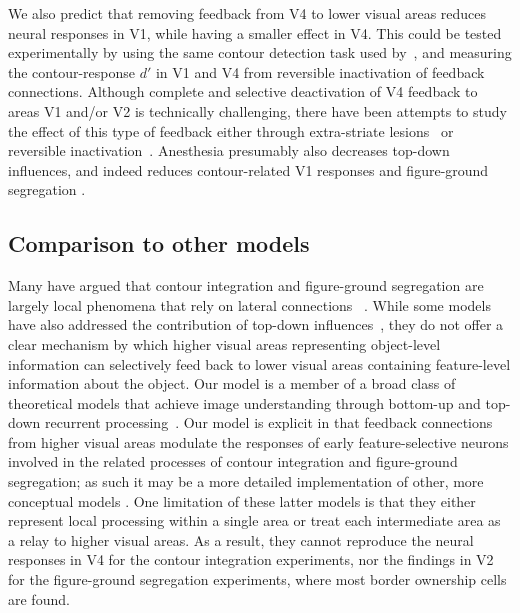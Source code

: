 { We also predict that removing feedback
 from V4 to lower visual areas
reduces neural responses in V1,
 while having a smaller effect in V4.
This could be tested experimentally by using the same contour
detection task used by~\cite{Chen_etal14}, and measuring the
contour-response $d'$ in V1 and V4 from reversible inactivation of
feedback connections. Although complete and selective deactivation of
V4
%
feedback to areas V1 and/or V2 is technically
 challenging, there have been attempts to study the effect of 
 this type of
 feedback
either through extra-striate lesions~\citep{Super_Lamme07} or
reversible inactivation~\citep{Jansen_etal12}.
Anesthesia presumably also decreases top-down influences, and indeed
reduces contour-related V1 responses \cite{Li_etal08a} and
figure-ground segregation \citep{Lamme_etal98}.

\subsection{Comparison to other models}
Many have argued that contour integration
 and figure-ground segregation
are 
largely
%
 local phenomena
that 
rely on
%
 lateral connections
~\citep{Grossberg94, Grossberg97, Li98, Zhaoping05,
  Piech_etal13}. 
  While some models have also addressed the contribution of top-down influences~\citep{Li98,Piech_etal13},
  they do not offer a clear mechanism by which higher visual areas representing object-level information can selectively feed back to lower visual areas containing feature-level information about the object.
Our model is a member of a broad class of theoretical models that
achieve image understanding through bottom-up and top-down recurrent
processing~\citep{Ullman84,Hochstein_Ahissar02,Roelfsema_06,Epshtein_etal08}.
Our model is explicit in that feedback connections from higher visual areas
modulate the responses of early feature-selective neurons involved in
the related processes of contour integration and figure-ground
segregation; as such it may be a more detailed implementation of
other, more conceptual models \citep{Piech_etal13,Poort_etal12}.
One limitation of these 
latter models is that they either represent local
processing within a single area or treat each intermediate area as a
relay to higher visual areas. As a result, they cannot reproduce the
neural responses in V4 for the contour integration experiments, nor
the findings in V2 for the figure-ground segregation experiments,
where most border ownership cells are found.

}
